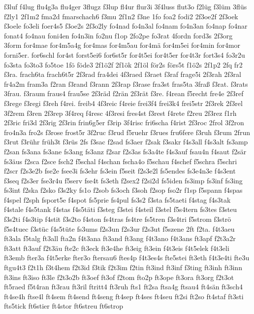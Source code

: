 {f3luf
f4lug
flu4g3a
flu4ger
3flugz
f3lup
fl4ur
flur3i
3f4luss
flut3o
f2lüg
f3lüm
3flüs
f2ly1
2f1m2
fma2d
fmarschach6
f3mu
2f1n2
f3ne
1fo
foa2
fodi2
2f3oe2f
2f3oek
f3oele
fo3eli
foer4s5
f3oe2s
2f3o2ly
fo4nad
fo4n3al
fo4nam
fo4n3an
fo4nap
fo4nar
fonat4
fo4nau
foni4en
fo4n3in
fo2nu
f1op
2fo2pe
fo3rat
4fordn
ford3s
2f3org
3form
for4mae
for4m5a4g
for4mas
for4m5au
for4mä
for4m5ei
for4min
for4mor
forni5er.
for6schl
for4st
forst5ei6
for6st5r
for4t5ei
for4t5er
for4t3r
fort3s4
fo3r2u
fo3sta
fo3to3
fo5toe
1fö
föde3
2f1ö2f
2f1ök
2f1öl
för2s
förs5t
f1ö2s
2f1p2
2fq
fr2
f3ra.
frach6ta
frach6t5r
2f3rad
fra4dei
4f3raed
f3raet
f3raf
frage5i
2f3rah
2f3ral
fr4a2m
fram3a
f2ran
f3rand
f3rann
2f3rap
f3rase
fra3st
fras5ta
3fraß
f3rat.
f3rats
3frau.
f3raum
fraus4
frau5se
2f3räd
f2rän
2f3rät
f3re.
f4rean
f5recht
fre4e
2f3ref
f3rege
f3regi
f3reh
f4rei.
freib4
4f3reic
f4reie
frei3f4
frei3k4
frei5str
2f3rek
2f3rel
3f2rem
f3ren
2f3rep
3f4req
f4resc
4f3resi
fres4st
f3rest
f4rete
f2reu
2f3rez
f1rh
2f3ric
fri3d
2f3rig
2f3rin
frin6g5er
f3rip
3f4risc
fri6scha
f4rist
2f3roc
2frol
3f2ron
fro4n3a
fro2s
f3rose
frost5r
3f2ruc
f3rud
f5ruehr
f3rues
fru6fere
f3ruh
f3rum
2frun
f3rut
f3rühr
früh3t
f3rüs
2fs
f3sac
f2sad
fs3aer
f2sak
f3sakr
f4s3all
f4s3alt
fs3amp
f2san
fs3ana
fs3ane
fs3ang
fs3anz
f2sar
f2s3as
fs3a4te
f4s3auf
fsau4n
f4saut
f2sär
fs3äus
f2sca
f2sce
fsch2
f5schal
f4schan
fscha4o
f5schau
f4schef
f5schra
f5schri
f2scr
f2s3e2b
fse2e
fsee3i
fs3ehr
fs3ein
f5seit
f2s3e2l
fs5endes
fs3e4n3e
f4s3ent
f3seq
f2s3er
fse3r4u
f5serv
fse4t
fs3eth
f2sex2
f2si2d
fs5iden
fs3imp
fs3inf
fs3ing
fs3int
f2ska
f2sko
f3s2ky
fs1o
f2sob
fs3och
f3soh
f2sop
fso2r
f1sp
f5spann
f4spas
f4spel
f2sph
fsport5e
f4spot
fs5prie
fs4pul
fs3s2
f3sta
fs5taeti
f4stag
f4s3tak
f4stale
f4s5tank
f4stas
f4s5täti
f3steg
f3stei
f4steil
f3stel
f5s4tern
fs3tes
f3steu
f3s2ti
f4s3tip
f4stit
f3s2to
f4ston
fs4tras
fs4tre
fs5tren
f3s4tri
f5strom
f3strö
f5s4tuec
f3stüc
f4s5tüte
fs3ums
f2s3un
f2s3ur
f2s3ut
f5szene
2ft
f2ta.
f4t3aeu
ft3ala
f5talg
ft3all
fta2n
f4t3ana
ft3and
ft3ang
f4t3ano
f4t3ans
ft3apf
f2t3a2r
ft3att
ft3auf
f2t3äu
fte2c
ft3eck
ft3e4he
ft3eig
ft3ein
f4t3eis
f4t5elek
f4t3eli
ft3emb
fter3a
f4t5erke
fter3o
ftersau6
ftes4p
f4t3es4s
fte5stei
ft3eth
f4t3e4ti
fte3u
ftgu4t3
f2t1h
f3t4hem
f2t3id
f3tik
f2t3im
f2tin
ft3ind
ft3inf
f3ting
ft3inh
ft3inn
ft3ins
ft3iso
ft3le
f2t3o2b
ft3oef
ft3of
f2tom
fto2p
ft3ope
ft3ora
ft3org
f2t3ot
ft5raed
f5t4ran
ft3rau
ft3ril
ftritt4
ft3ruh
fts1
ft2sa
ftsa4g
ftsau4
ft4sän
ft3sch4
ft4se4h
ftse4l
ft4sem
ft4send
ft4seng
ft4sep
ft4ses
ft4seu
ft2si
ft2so
ft4staf
ft3sti
fts5tick
ft6stier
ft4stor
ft6streu
ft6strop
}
